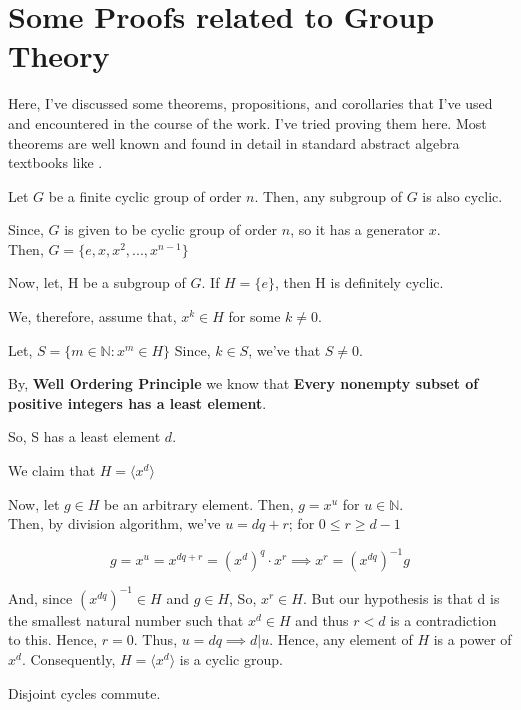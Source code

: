 \section{Some Proofs related to Group Theory}
\label{Cycle Proof}
Here, I've discussed some theorems, propositions, and corollaries that I've used and encountered in the course of the work. I've tried proving them here. Most theorems are well known and found in detail in standard abstract algebra textbooks like \cite{gallian,dummit2003abstract}. 

\begin{theorem}
    Let $G$ be a finite cyclic group of order $n$. Then, any subgroup of $G$ is also cyclic.
\end{theorem}
\begin{proofcustom}
    Since, $G$ is given to be cyclic group of order $n$, so it has a generator $x$.\\
Then, $\boxed{G=\{e,x, x^2, ..., x^{n-1}\}}$

Now, let, H be a subgroup of $G$. If $H=\{e\}$, then H is definitely cyclic.

We, therefore, assume that, $x^k \in H$ for some $k \neq 0$.

Let, $S=\{ m \in \mathbb{N} : x^m \in H\}$
Since, $k\in S$, we've that $S\neq 0$.

By, \textbf{Well Ordering Principle} we know that \textbf{Every nonempty subset of  positive integers has a least element}.



So, S has a least element $d$.

We claim that $H= \langle x^d \rangle$

Now, let $g\in H$ be an arbitrary element. Then, $g= x^u$ for $u \in \mathbb{N}$. \\

Then, by division algorithm, we've 
$u=dq+r$; for $0\leq r \geq d-1$

   $$\boxed{ g= x^u=x^{dq+r}= {(x^d)}^q \cdot x^r \implies x^r= {(x^{dq})}^{-1}g}$$

And, since ${(x^{dq})}^{-1} \in H$ and $g \in H$, So, $x^r \in H$.
But our hypothesis is that d is the smallest natural number such that $x^d \in H$ and thus $r <d$ is a contradiction to this. 
Hence, $r=0$.
Thus, $u=dq \implies d | u$. 
Hence, any element of $H$ is a power of $x^d$.
Consequently, $H= \langle x^d \rangle$ is a cyclic group. 
\end{proofcustom}
\begin{theorem}
    Disjoint cycles commute. 

\end{theorem}


